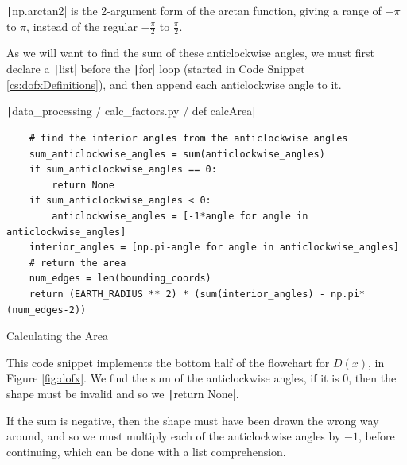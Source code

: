 \documentclass[12pt]{report}
\newcommand{\pil}[1]{\protect\texttt|#1|}
\begin{document}
\pil{np.arctan2} is the 2-argument form of the arctan function, giving a range of $-\pi$ to $\pi$, instead of the regular $-\frac{\pi}{2}$ to $\frac{\pi}{2}$.

As we will want to find the sum of these anticlockwise angles, we must first declare a \pil{list} before the \pil{for} loop (started in Code Snippet \ref{cs:dofxDefinitions}), and then append each anticlockwise angle to it.

\begin{center}
\end{center}

\begin{listing}[H]
\pil{data_processing / calc_factors.py / def calcArea}
\begin{verbatim}
    # find the interior angles from the anticlockwise angles
    sum_anticlockwise_angles = sum(anticlockwise_angles)
    if sum_anticlockwise_angles == 0:
        return None
    if sum_anticlockwise_angles < 0:
        anticlockwise_angles = [-1*angle for angle in anticlockwise_angles]
    interior_angles = [np.pi-angle for angle in anticlockwise_angles]
    # return the area
    num_edges = len(bounding_coords)
    return (EARTH_RADIUS ** 2) * (sum(interior_angles) - np.pi*(num_edges-2))
\end{verbatim}
\caption{Calculating the Area}\label{cs:dofxArea}
\end{listing}

This code snippet implements the bottom half of the flowchart for $D\left(x\right)$, in Figure \ref{fig:dofx}. We find the sum of the anticlockwise angles, if it is 0, then the shape must be invalid and so we \pil{return None}.

If the sum is negative, then the shape must have been drawn the wrong way around, and so we must multiply each of the anticlockwise angles by $-1$, before continuing, which can be done with a list comprehension.
\end{document}
